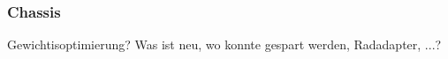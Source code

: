 \documentclass[main.tex]{subfiles} %
\begin{document}

\subsubsection{Chassis}

Gewichtisoptimierung? Was ist neu, wo konnte gespart werden, Radadapter, ...?
\end{document}
